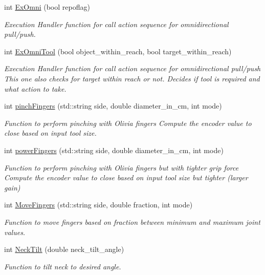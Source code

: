 \begin{DoxyCompactItemize}
int \hyperlink{structManipulate_ad8c0f3dc7de79a53da885f538354cfd8}{Ex\+Omni} (bool repoflag)
\begin{DoxyCompactList}\small\item\em Execution Handler function for call action sequence for omnidirectional pull/push. \end{DoxyCompactList}\item 
int \hyperlink{structManipulate_a5878c899118b3be92224c4b276ae06ff}{Ex\+Omni\+Tool} (bool object\+\_\+within\+\_\+reach, bool target\+\_\+within\+\_\+reach)
\begin{DoxyCompactList}\small\item\em Execution Handler function for call action sequence for omnidirectional pull/push This one also checks for target within reach or not. Decides if tool is required and what action to take. \end{DoxyCompactList}\item 
int \hyperlink{structManipulate_a74fb07d3b191e25ca23c36b1cc7ed6a9}{pinch\+Fingers} (std\+::string side, double diameter\+\_\+in\+\_\+cm, int mode)
\begin{DoxyCompactList}\small\item\em Function to perform pinching with Olivia fingers Compute the encoder value to close based on input tool size. \end{DoxyCompactList}\item 
int \hyperlink{structManipulate_ac16ad710b70a15624c7952b35a891974}{power\+Fingers} (std\+::string side, double diameter\+\_\+in\+\_\+cm, int mode)
\begin{DoxyCompactList}\small\item\em Function to perform pinching with Olivia fingers but with tighter grip force Compute the encoder value to close based on input tool size but tighter (larger gain) \end{DoxyCompactList}\item 
int \hyperlink{structManipulate_a7e87b30f595ed31297fcd2e8759b6fb1}{Move\+Fingers} (std\+::string side, double fraction, int mode)
\begin{DoxyCompactList}\small\item\em Function to move fingers based on fraction between minimum and maximum joint values. \end{DoxyCompactList}\item 
int \hyperlink{structManipulate_a51974f3f0cfc09d119d229b7a3386d24}{Neck\+Tilt} (double neck\+\_\+tilt\+\_\+angle)
\begin{DoxyCompactList}\small\item\em Function to tilt neck to desired angle. \end{DoxyCompactList}\item 

\end{DoxyCompactItemize}

